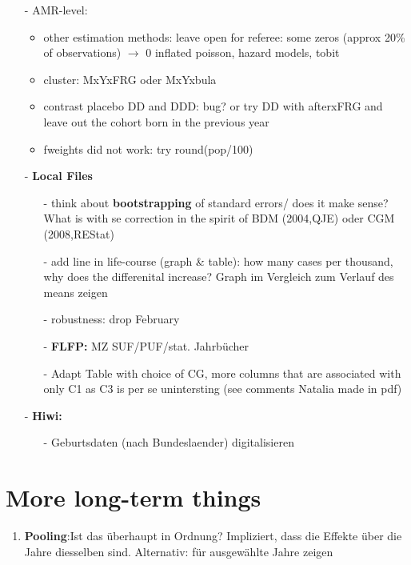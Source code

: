 \documentclass[11pt,a4paper]{article}
\begin{document}
{\begin{itemize}
		\item[-] AMR-level:
		\begin{itemize}
		\item other estimation methods:  leave open for referee: some zeros (approx 20\% of observations) $\rightarrow$ 0 inflated poisson, hazard models, tobit 
		\item cluster: MxYxFRG oder MxYxbula
		\item contrast placebo DD and DDD: bug? or try DD with afterxFRG and leave out the cohort born in the previous year
		\item fweights did not work: try round(pop/100)
		\end{itemize}
		

\item[-] \textbf{Local Files}
\begin{itemize}
	\item[-] think about \textbf{bootstrapping} of standard errors/ does it make sense? What is with se correction in the spirit of BDM (2004,QJE) oder CGM (2008,REStat)
	\item[-] add line in life-course (graph \& table): how many cases per thousand, why does the differenital increase? Graph im Vergleich zum Verlauf des means zeigen
	
	\item[-] robustness: drop February
	
	\item[-] \textbf{FLFP:} MZ SUF/PUF/stat. Jahrbücher
	
	\item[-] Adapt Table with choice of CG, more columns that are associated with only C1 as C3 is per se unintersting (see comments Natalia made in pdf)
\end{itemize}	

\item[-] \textbf{Hiwi: }
\begin{itemize}
\item[-] Geburtsdaten (nach Bundeslaender) digitalisieren
\end{itemize}
\end{itemize}
\newpage
\section{More long-term things}
\begin{enumerate}
\item \textbf{Pooling}:\newline Ist das  überhaupt in Ordnung? Impliziert, dass die Effekte über die Jahre diesselben sind. Alternativ: für ausgewählte	Jahre zeigen



\end{enumerate}}
\end{document}
